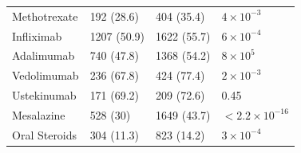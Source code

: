 \begin{table}
\begin{tabular}[t]{llll}
  \hspace{1em}Methotrexate & 192 (28.6) & 404 (35.4) & ${4\times10^{-3}}$\\
  \hspace{1em}Infliximab & 1207 (50.9) & 1622 (55.7) & $6\times10^{-4}$\\
  \hspace{1em}Adalimumab & 740 (47.8) & 1368 (54.2) & $8\times10^{5}$\\
  \hspace{1em}Vedolimumab & 236 (67.8) & 424 (77.4) & $2\times10^{-3}$\\
  \hspace{1em}Ustekinumab & 171 (69.2) & 209 (72.6) & 0.45\\
  \hspace{1em}Mesalazine & 528 (30) & 1649 (43.7) & $< 2.2\times10^{-16}$\\
  \hspace{1em}Oral Steroids & 304 (11.3) & 823 (14.2) & $3\times10^{-4}$\\
 
  \bottomrule
  \end{tabular}

  \end{table}
  
